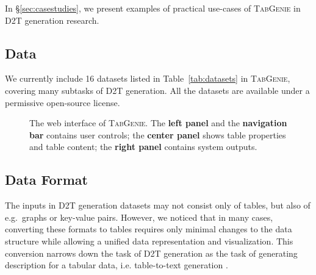 In §\ref{sec:casestudies}, we present examples of practical use-cases of \textsc{TabGenie} in D2T generation research.

\subsection{Data}
\label{sec:tabgenie:data}
We currently include 16 datasets listed in Table~\ref{tab:datasets} in \textsc{TabGenie}, covering many subtasks of D2T generation. All the datasets are available under a permissive open-source license.

\begin{figure}[t]
    \centering
    \setlength{\fboxsep}{0pt}
    \caption{The web interface of \textsc{TabGenie}. The \textbf{left panel} and the \textbf{navigation bar} contains user controls; the \textbf{center panel} shows table properties and table content; the \textbf{right panel} contains system outputs.}
    \label{fig:web}
\end{figure}


\subsection{Data Format}
The inputs in D2T generation datasets may not consist only of tables, but also of e.g.\ graphs or key-value pairs. However, we noticed that in many cases, converting these formats to tables requires only minimal changes to the data structure while allowing a unified data representation and visualization. This conversion narrows down the task of D2T generation as the task of generating description for a tabular data, i.e. table-to-text generation \cite{parikh2020totto, liu2022plog, gong2020tablegpt}.


